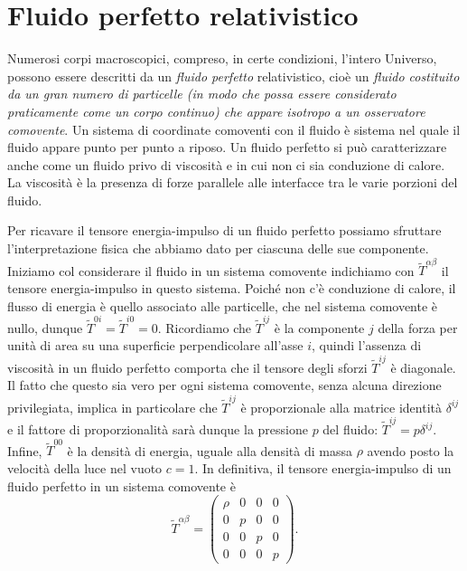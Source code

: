 \section{Fluido perfetto relativistico}
\label{sec:fluido-perfetto}

Numerosi corpi macroscopici, compreso, in certe condizioni, l'intero Universo,
possono essere descritti da un \emph{fluido perfetto}
relativistico, cioè un
\emph{fluido costituito da un gran numero di particelle (in modo che possa
  essere considerato praticamente come un corpo continuo) che appare isotropo a
  un osservatore comovente}.
Un sistema di coordinate comoventi con il fluido è sistema nel quale il fluido
appare punto per punto a riposo.  Un fluido perfetto si può caratterizzare anche
come un fluido privo di viscosità e in cui non ci sia conduzione di calore.  La
viscosità è la presenza di forze parallele alle interfacce tra le varie porzioni
del fluido.

Per ricavare il tensore energia-impulso di un fluido perfetto possiamo sfruttare
l'interpretazione fisica che abbiamo dato per ciascuna delle sue componente.
Iniziamo col considerare il fluido in un sistema comovente indichiamo con
$\tilde T^{\alpha\beta}$ il tensore energia-impulso in questo sistema.  Poiché
non c'è conduzione di calore, il flusso di energia è quello associato alle
particelle, che nel sistema comovente è nullo, dunque
$\tilde T^{0i} = \tilde T^{i0} = 0$.  Ricordiamo che $\tilde T^{ij}$ è la
componente $j$ della forza per unità di area su una superficie perpendicolare
all'asse $i$, quindi l'assenza di viscosità in un fluido perfetto comporta che
il tensore degli sforzi $\tilde T^{ij}$ è diagonale.  Il fatto che questo sia
vero per ogni sistema comovente, senza alcuna direzione privilegiata, implica in
particolare che $\tilde T^{ij}$ è proporzionale alla matrice identità
$\delta^{ij}$ e il fattore di proporzionalità sarà dunque la pressione $p$ del
fluido: $\tilde T^{ij} = p \delta^{ij}$.  Infine, $\tilde T^{00}$ è la densità
di energia, uguale alla densità di massa $\rho$ avendo posto la velocità della
luce nel vuoto $c = 1$.  In definitiva, il tensore energia-impulso di un fluido
perfetto in un sistema comovente è
\begin{equation}
  \tilde T^{\alpha\beta} =
  \begin{pmatrix}
    \rho & 0 & 0 & 0 \\
    0    & p & 0 & 0 \\
    0    & 0 & p & 0 \\
    0    & 0 & 0 & p
  \end{pmatrix}.
\end{equation}

